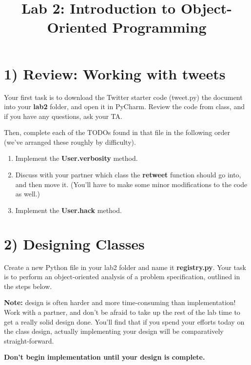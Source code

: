 \documentclass[12pt]{article}
\begin{document}
\title{Lab 2: Introduction to Object-Oriented Programming}
\date{}
\maketitle

\section*{1) Review: Working with tweets}
Your first task is to download the Twitter starter code (tweet.py) the document into your \textbf{lab2} folder, and open it in PyCharm.
Review the code from class, and if you have any questions, ask your TA.

\bigskip

\noindent Then, complete each of the TODOs found in that file in the following order (we’ve
arranged these roughly by difficulty).

\bigskip

\begin{enumerate}[1.]
    \item Implement the \textbf{User.verbosity} method.
    \item Discuss with your partner which class the \textbf{retweet} function should go into,
    and then move it. (You’ll have to make some minor modifications to the code as well.)
    \item Implement the \textbf{User.hack} method.
\end{enumerate}

\bigskip

\section*{2) Designing Classes}

Create a new Python file in your lab2 folder and name it \textbf{registry.py}.
Your task is to perform an object-oriented analysis of a problem specification, outlined in the steps below.

\bigskip

\textbf{Note:} design is often harder and more time-consuming than implementation!
Work with a partner, and don’t be afraid to take up the rest of the lab time to get a really solid design done. You’ll find that if you spend your efforts today on the class design, actually implementing your design will be comparatively straight-forward.

\bigskip

\textbf{Don’t begin implementation until your design is complete.}
\end{document}
